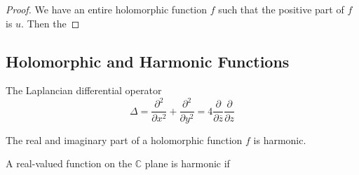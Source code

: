 \documentclass[main.tex]{subfiles}
\begin{document}
\begin{proof}
We have an entire holomorphic function $f$ such that the positive part of $f$ is $u$. Then the 
\end{proof}
\subsection{Holomorphic and Harmonic Functions}

The Laplancian differential operator 
$$
\Delta = \frac{\partial^2}{\partial x^2} + \frac{\partial^2}{\partial y^2} = 4 \frac{\partial}{\partial \overline{z}} \frac{\partial}{\partial {z}}
$$

The real and imaginary part of a holomorphic function $f$ is harmonic.

A real-valued function on the $\mathbb{C}$ plane is harmonic if 
\end{document}
